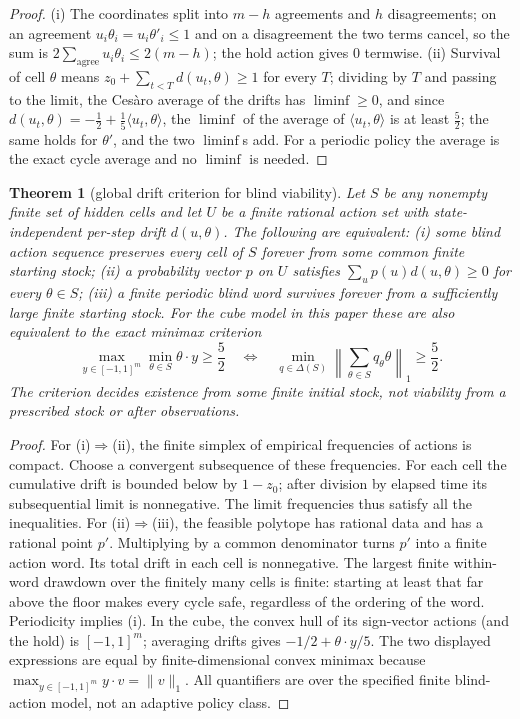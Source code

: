 \documentclass[10pt,twocolumn]{article}
\theoremstyle{plain}
\newtheorem{theorem}{Theorem}
\theoremstyle{definition}
\theoremstyle{remark}
\begin{document}
\begin{proof}
(i) The coordinates split into \(m - h\) agreements and \(h\)
disagreements; on an agreement \(u_{i}\theta_{i} = u_{i}\theta'_{i}
\le 1\) and on a disagreement the two terms cancel, so the sum is
\(2 \sum_{\text{agree}} u_{i}\theta_{i} \le 2(m-h)\); the hold
action gives \(0\) termwise. (ii) Survival of cell \(\theta\) means
\(z_{0} + \sum_{t < T} d(u_{t}, \theta) \ge 1\) for every \(T\);
dividing by \(T\) and passing to the limit, the Ces\`aro average of
the drifts has \(\liminf \ge 0\), and since
\(d(u_{t}, \theta) = -\tfrac12 + \tfrac15\langle u_{t},
\theta\rangle\), the \(\liminf\) of the average of
\(\langle u_{t}, \theta\rangle\) is at least
\(\tfrac52\); the same holds for \(\theta'\), and the two
\(\liminf\)s add. For a periodic policy the average is the exact
cycle average and no \(\liminf\) is needed.
\end{proof}

\begin{theorem}[global drift criterion for blind viability]
\label{scale-thm:global-drift}
Let $S$ be any nonempty finite set of hidden cells and let $U$ be a
finite rational action set with state-independent per-step drift
$d(u,\theta)$. The following are equivalent:
(i) some blind action sequence preserves every cell of $S$ forever
from some common \emph{finite} starting stock;
(ii) a probability vector $p$ on $U$ satisfies
$\sum_u p(u)d(u,\theta)\ge0$ for every $\theta\in S$;
(iii) a finite periodic blind word survives forever from a sufficiently
large finite starting stock. For the cube model in this paper these are
also equivalent to the exact minimax criterion
\[
\max_{y\in[-1,1]^m}\min_{\theta\in S}\theta\cdot y\ge\frac52
\quad\Longleftrightarrow\quad
\min_{q\in\Delta(S)}\left\|\sum_{\theta\in S}q_\theta\theta\right\|_1
\ge\frac52.
\]
The criterion decides existence from \emph{some} finite initial stock,
not viability from a prescribed stock or after observations.
\end{theorem}
\begin{proof}
For (i)$\Rightarrow$(ii), the finite simplex of empirical frequencies
of actions is compact. Choose a convergent subsequence of these
frequencies. For each cell the cumulative drift is bounded below by
$1-z_0$; after division by elapsed time its subsequential limit is
nonnegative. The limit frequencies thus satisfy all the inequalities.
For (ii)$\Rightarrow$(iii), the feasible polytope has rational data
and has a rational point $p'$. Multiplying by a common denominator
turns $p'$ into a finite action word. Its total drift in each cell is
nonnegative. The largest finite within-word drawdown over the finitely
many cells is finite: starting at least that far above the floor makes
every cycle safe, regardless of the ordering of the word. Periodicity
implies (i). In the cube, the convex hull of its sign-vector actions
(and the hold) is $[-1,1]^m$; averaging drifts gives
$-1/2+\theta\cdot y/5$. The two displayed expressions are equal by
finite-dimensional convex minimax because
$\max_{y\in[-1,1]^m}y\cdot v=\|v\|_1$. All quantifiers are over the
specified finite blind-action model, not an adaptive policy class.
\end{proof}
\end{document}
